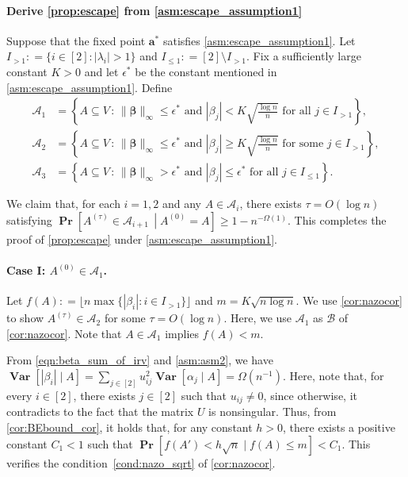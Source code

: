 \documentclass[letterpaper,11pt]{article}
\renewcommand\Pr{\mathop{\mathbf{Pr}}}
\newcommand{\Var}{\mathop{\mathbf{Var}}}%
\def\defeq{\mathrel{\mathop:}=}%
\begin{document}
\paragraph*{Derive \cref{prop:escape} from \cref{asm:escape_assumption1}} \label{sec:derivethm2.11fromasm2.9}
Suppose that the fixed point $\mathbf{a}^*$ satisfies \cref{asm:escape_assumption1}.
Let $I_{>1} \defeq \{i\in[2]:|\lambda_i|>1\}$ and $I_{\leq 1} \defeq [2]\setminus I_{>1}$.
Fix a sufficiently large constant $K>0$ and let $\epsilon^*$ be the constant mentioned in \cref{asm:escape_assumption1}.
Define
\begin{align*}
\mathcal{A}_1&=\left\{A\subseteq V\,:\, \|{\boldsymbol \beta}\|_\infty \leq \epsilon^* \text{ and }|\beta_j|< K\sqrt{\frac{\log n}{n}} \text{ for all }j\in I_{>1} \right\},\\
\mathcal{A}_2&=\left\{A\subseteq V\,:\, \|{\boldsymbol \beta}\|_\infty \leq \epsilon^* \text{ and }|\beta_j|\geq K\sqrt{\frac{\log n}{n}} \text{ for some }j\in I_{>1} \right\},\\
\mathcal{A}_3&=\left\{A\subseteq V\,:\, \|{\boldsymbol \beta}\|_\infty >\epsilon^* \text{ and }|\beta_j|\leq \epsilon^* \text{ for all }j\in I_{\leq 1} \right\}.
\end{align*}

We claim that, for each $i=1,2$ and any $A\in \mathcal{A}_i$, there exists $\tau=O(\log n)$ satisfying $\Pr\left[A^{(\tau)}\in \mathcal{A}_{i+1}\,\middle| A^{(0)}=A \right] \geq 1-n^{-\Omega(1)}$.
This completes the proof of \cref{prop:escape} under \cref{asm:escape_assumption1}.

\paragraph*{Case I: $A^{(0)}\in \mathcal{A}_1$.}
Let $f(A)\defeq \lfloor n\max\{|\beta_i|:i\in I_{>1}\}\rfloor$ and $m=K\sqrt{n\log n}$.
We use \cref{cor:nazocor} to show $A^{(\tau)}\in \mathcal{A}_2$ for some $\tau=O(\log n)$.
Here, we use $\mathcal{A}_1$ as $\mathcal{B}$ of \cref{cor:nazocor}.
Note that $A\in\mathcal{A}_1$ implies $f(A)<m$.

From \cref{eqn:beta_sum_of_irv} and \ref{asm:asm2}, we have $\Var[|\beta_i|  \mid  A]=\sum_{j\in[2]} u_{ij}^2 \Var[\alpha_j \mid A]=\Omega(n^{-1})$.
Here, note that, for every $i\in[2]$, there exists $j\in[2]$ such that $u_{ij}\neq 0$, since otherwise, it contradicts to the fact that the matrix $U$ is nonsingular.
Thus, from \cref{cor:BEbound_cor}, it holds that, for any constant $h>0$, there exists a positive constant $C_1<1$ such that $\Pr[f(A')< h\sqrt{n} \mid f(A)\leq m] < C_1.$
This verifies the condition~\ref{cond:nazo_sqrt} of \cref{cor:nazocor}.
\end{document}
